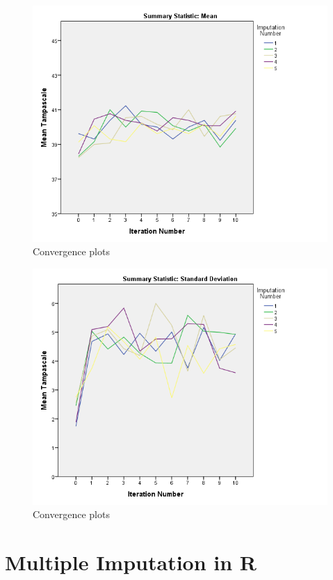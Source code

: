 \documentclass[
]{book}
\begin{document}
\begin{figure}

{\centering \includegraphics[width=0.9\linewidth]{images/fig4.18} 

}

\caption{Convergence plots}\label{fig:fig4-18-1}
\end{figure}
\begin{figure}

{\centering \includegraphics[width=0.9\linewidth]{images/fig4.19} 

}

\caption{Convergence plots}\label{fig:fig4-18-2}
\end{figure}

\hypertarget{multiple-imputation-in-r}{%
\section{Multiple Imputation in R}\label{multiple-imputation-in-r}}
\end{document}
